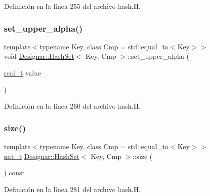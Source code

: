 Definición en la línea 255 del archivo hash.\+H.

\mbox{\label{class_designar_1_1_hash_set_a7d15d7b087df1da351a6820396ca3456}} 
\subsubsection{\texorpdfstring{set\+\_\+upper\+\_\+alpha()}{set\_upper\_alpha()}}
{\footnotesize\ttfamily template$<$typename Key, class Cmp = std\+::equal\+\_\+to$<$\+Key$>$$>$ \\
void \hyperlink{class_designar_1_1_hash_set}{Designar\+::\+Hash\+Set}$<$ Key, Cmp $>$\+::set\+\_\+upper\+\_\+alpha (\begin{DoxyParamCaption}\item[{\hyperlink{namespace_designar_aca2c32af26808dbec1f3a3071fad25ce}{real\+\_\+t}}]{value }\end{DoxyParamCaption})\hspace{0.3cm}{\ttfamily [inline]}}



Definición en la línea 260 del archivo hash.\+H.

\mbox{\label{class_designar_1_1_hash_set_a0026e1b2caf94d25b554cd6a399f691f}} 
\subsubsection{\texorpdfstring{size()}{size()}}
{\footnotesize\ttfamily template$<$typename Key, class Cmp = std\+::equal\+\_\+to$<$\+Key$>$$>$ \\
\hyperlink{namespace_designar_aa72662848b9f4815e7bf31a7cf3e33d1}{nat\+\_\+t} \hyperlink{class_designar_1_1_hash_set}{Designar\+::\+Hash\+Set}$<$ Key, Cmp $>$\+::size (\begin{DoxyParamCaption}{ }\end{DoxyParamCaption}) const\hspace{0.3cm}{\ttfamily [inline]}}



Definición en la línea 281 del archivo hash.\+H.

